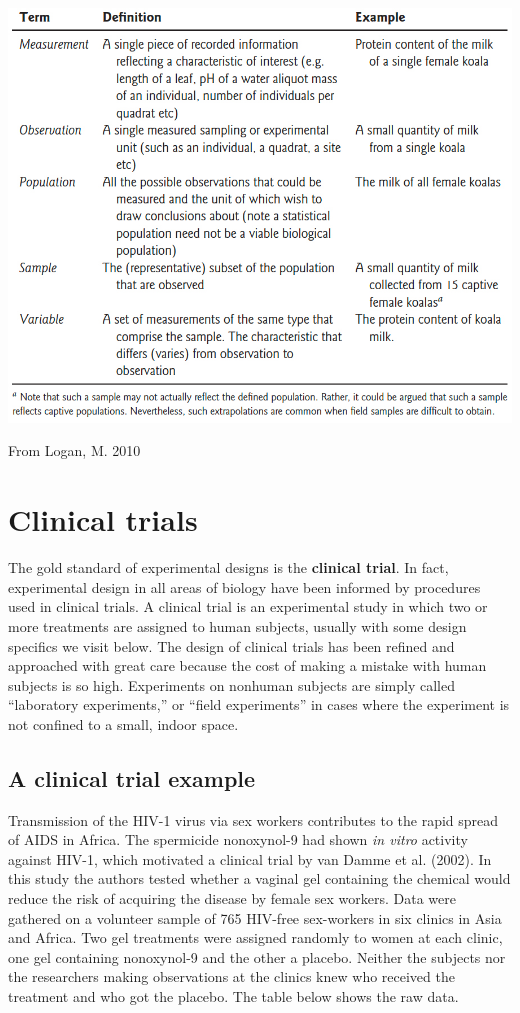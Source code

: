 \documentclass[]{book}
\begin{document}
\includegraphics[width=12.4in]{images/Logan_ExpTerms}

From Logan, M. 2010

\hypertarget{clinical-trials}{%
\section{Clinical trials}\label{clinical-trials}}

The gold standard of experimental designs is the \textbf{clinical trial}. In fact, experimental design in all areas of biology have been informed by procedures used in clinical trials. A clinical trial is an experimental study in which two or more treatments are assigned to human subjects, usually with some design specifics we visit below. The design of clinical trials has been refined and approached with great care because the cost of making a mistake with human subjects is so high. Experiments on nonhuman subjects are simply called ``laboratory experiments,'' or ``field experiments'' in cases where the experiment is not confined to a small, indoor space.

\hypertarget{a-clinical-trial-example}{%
\subsection{A clinical trial example}\label{a-clinical-trial-example}}

Transmission of the HIV-1 virus via sex workers contributes to the rapid spread of AIDS in Africa. The spermicide nonoxynol-9 had shown \emph{in vitro} activity against HIV-1, which motivated a clinical trial by van Damme et al. (2002). In this study the authors tested whether a vaginal gel containing the chemical would reduce the risk of acquiring the disease by female sex workers. Data were gathered on a volunteer sample of 765 HIV-free sex-workers in six clinics in Asia and Africa. Two gel treatments were assigned randomly to women at each clinic, one gel containing nonoxynol-9 and the other a placebo. Neither the subjects nor the researchers making observations at the clinics knew who received the treatment and who got the placebo. The table below shows the raw data.
\end{document}

